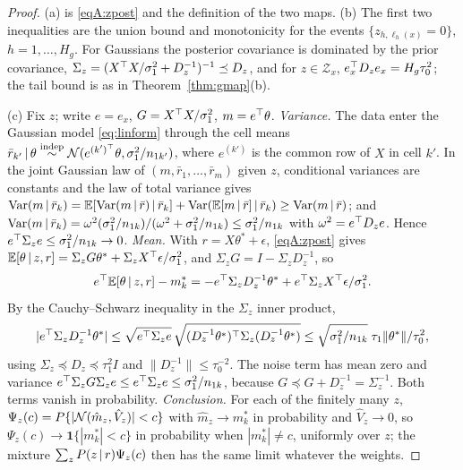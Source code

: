 \begin{proof}
(a) is \eqref{eqA:zpost} and the definition of the two maps. (b) The first two inequalities are the union bound and monotonicity for the events $\{z_{h,\ell_h(x)}=0\}$, $h=1,\dots,H_g$. For Gaussians the posterior covariance is dominated by the prior covariance, $\Sigma_z=(X^{\top} X/\sigma_1^2+D_z^{-1})^{-1}\preceq D_z$, and for $z\in\mathcal Z_x$, $e_x^{\top} D_ze_x=H_g\tau_0^2$; the tail bound is as in Theorem~\ref{thm:gmap}(b).

(c) Fix $z$; write $e=e_x$, $G=X^{\top} X/\sigma_1^2$, $m=e^{\top}\theta$. \emph{Variance.} The data enter the Gaussian model \eqref{eq:linform} through the cell means $\bar r_{k'}\,\vert\,\theta\stackrel{\text{indep}}{\sim}\mathcal{N}(e^{(k')^{\top}}\theta,\sigma_1^2/n_{1k'})$, where $e^{(k')}$ is the common row of $X$ in cell $k'$. In the joint Gaussian law of $(m,\bar r_1,\dots,\bar r_m)$ given $z$, conditional variances are constants and the law of total variance gives $\mathrm{Var}(m\,\vert\,\bar r_k)=\mathbb{E}[\mathrm{Var}(m\,\vert\,\bar r)\,\vert\,\bar r_k]+\mathrm{Var}(\mathbb{E}[m\,\vert\,\bar r]\,\vert\,\bar r_k)\ge\mathrm{Var}(m\,\vert\,\bar r)$; and $\mathrm{Var}(m\,\vert\,\bar r_k)=\omega^2(\sigma_1^2/n_{1k})/(\omega^2+\sigma_1^2/n_{1k})\le\sigma_1^2/n_{1k}$ with $\omega^2=e^{\top} D_ze$. Hence $e^{\top}\Sigma_ze\le\sigma_1^2/n_{1k}\to0$. \emph{Mean.} With $r=X\theta^\ast+\epsilon$, \eqref{eqA:zpost} gives $\mathbb{E}[\theta\,\vert\, z,r]=\Sigma_zG\theta^\ast+\Sigma_zX^{\top}\epsilon/\sigma_1^2$, and $\Sigma_zG=I-\Sigma_zD_z^{-1}$, so
\[
e^{\top}\mathbb{E}[\theta\,\vert\, z,r]-m_k^\ast=-e^{\top}\Sigma_zD_z^{-1}\theta^\ast+e^{\top}\Sigma_zX^{\top}\epsilon/\sigma_1^2 .
\]
By the Cauchy--Schwarz inequality in the $\Sigma_z$ inner product,
\[
|e^{\top}\Sigma_zD_z^{-1}\theta^\ast|\le\sqrt{e^{\top}\Sigma_ze}\,\sqrt{(D_z^{-1}\theta^\ast)^{\top}\Sigma_z(D_z^{-1}\theta^\ast)}\le\sqrt{\sigma_1^2/n_{1k}}\;\tau_1\|\theta^\ast\|/\tau_0^2 ,
\]
using $\Sigma_z\preceq D_z\preceq\tau_1^2I$ and $\|D_z^{-1}\|\le\tau_0^{-2}$. The noise term has mean zero and variance $e^{\top}\Sigma_zG\Sigma_ze\le e^{\top}\Sigma_ze\le\sigma_1^2/n_{1k}$, because $G\preceq G+D_z^{-1}=\Sigma_z^{-1}$. Both terms vanish in probability. \emph{Conclusion.} For each of the finitely many $z$, $\Psi_z(c)=P\{|\mathcal{N}(\hat m_z,\hat V_z)|<c\}$ with $\hat m_z\to m_k^\ast$ in probability and $\hat V_z\to0$, so $\Psi_z(c)\to\mathbf 1\{|m_k^\ast|<c\}$ in probability when $|m_k^\ast|\ne c$, uniformly over $z$; the mixture $\sum_zP(z\,\vert\, r)\Psi_z(c)$ then has the same limit whatever the weights.
\end{proof}

